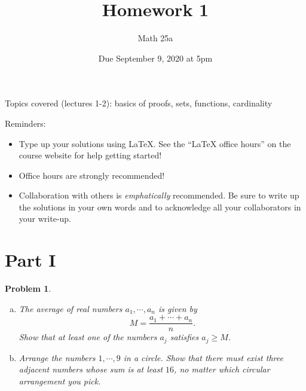 \documentclass[11pt]{article}
\author{Math 25a}
\date{Due September 9, 2020 at 5pm}
\title{Homework 1}
\newtheorem{problem}{Problem}
\theoremstyle{definition}
\theoremstyle{case}
\begin{document}
\maketitle

Topics covered (lectures 1-2): basics of proofs, sets, functions, cardinality

Reminders: 
\begin{itemize}
\item Type up your solutions using \LaTeX. See the ``LaTeX office hours'' on the course website for help getting started!
\item Office hours are strongly recommended! 
\item Collaboration with others is \emph{emphatically} recommended. Be sure to write up the solutions in your own words and to acknowledge all your collaborators in your write-up.
\end{itemize}

\section{Part I}

\begin{problem}
\begin{enumerate}[(a)]
\item The average of real numbers $a_1, \cdots, a_n$ is given by $$M = \frac{a_1 + \cdots + a_n}{n}.$$ Show that at least one of the numbers $a_j$ satisfies $a_j \ge M$.
\item Arrange the numbers $1, \cdots, 9$ in a circle. Show that there must exist three adjacent numbers whose sum is at least $16$, no matter which circular arrangement you pick.
\end{enumerate}
\end{problem}
\end{document}
